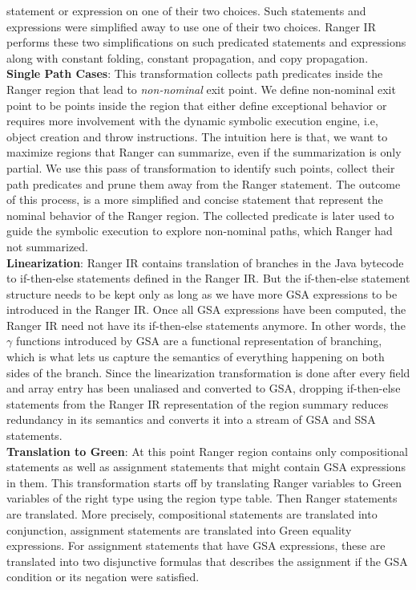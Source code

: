 statement or expression on one of their two choices.
%
Such statements and expressions were simplified away to use one of their two choices.
%
Ranger IR performs these two simplifications on such predicated statements and expressions along with constant folding,
constant propagation, and copy propagation.\\
\textbf{Single Path Cases}: This transformation collects path predicates inside the Ranger region that lead to \textit{non-nominal} exit point. 
%
We define non-nominal exit point to be points inside the region that either define exceptional behavior or requires more involvement with the dynamic symbolic execution engine, i.e, object creation and throw instructions.
%
The intuition here is that, we want to maximize regions that Ranger can summarize, even if the summarization is only partial. 
%
We use this pass of transformation to identify such points, collect their path predicates and prune them away from the Ranger statement. 
%
The outcome of this process, is a more simplified and concise statement that represent the nominal behavior of the Ranger region.
%
The collected predicate is later used to guide the symbolic execution to explore non-nominal paths, which Ranger had not summarized.  \\
%
\textbf{Linearization}: 
Ranger IR contains translation of branches in the Java bytecode to if-then-else statements defined in the Ranger IR.
%
But the if-then-else statement structure needs to be kept only as long as we have more GSA expressions to be
introduced in the Ranger IR.
%
Once all GSA expressions have been computed, the Ranger IR need not have its if-then-else statements anymore.
%
In other words, the $\gamma$ functions introduced by GSA are a functional representation of branching, which is what lets us
capture the semantics of everything happening on both sides of the branch.
%
Since the linearization transformation is done after every field and array entry has been unaliased and converted to
GSA, dropping if-then-else statements from the Ranger IR representation of the region summary reduces redundancy in its
semantics and converts it into a stream of GSA and SSA statements.\\
\textbf{Translation to Green}: 
%
At this point Ranger region contains only compositional statements as well as assignment statements that might contain GSA expressions in them.
%
This transformation starts off by translating Ranger variables to Green variables of the right type using the region type table. 
%
Then Ranger statements are translated. More precisely, compositional statements are translated into conjunction, assignment statements are translated into Green equality expressions.
%
For assignment statements that have GSA expressions, these are translated into two disjunctive formulas that describes the assignment if the GSA condition or its negation were satisfied. \\

